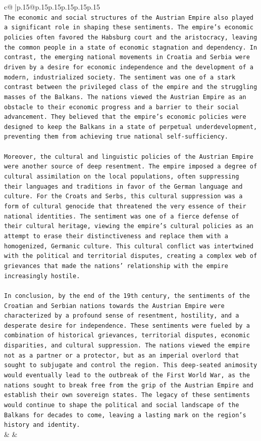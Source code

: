 \documentclass{article}
\begin{document}
{\begin{supertabular}{c@{$\;$}|p{.15\linewidth}@{}p{.15\linewidth}p{.15\linewidth}p{.15\linewidth}p{.15\linewidth}p{.15\linewidth}}
{{{\\ 
\texttt{The economic and social structures of the Austrian Empire also played a significant role in shaping these sentiments. The empire's economic policies often favored the Habsburg court and the aristocracy, leaving the common people in a state of economic stagnation and dependency. In contrast, the emerging national movements in Croatia and Serbia were driven by a desire for economic independence and the development of a modern, industrialized society. The sentiment was one of a stark contrast between the privileged class of the empire and the struggling masses of the Balkans. The nations viewed the Austrian Empire as an obstacle to their economic progress and a barrier to their social advancement. They believed that the empire's economic policies were designed to keep the Balkans in a state of perpetual underdevelopment, preventing them from achieving true national self{-}sufficiency.} \\
\\ 
\texttt{Moreover, the cultural and linguistic policies of the Austrian Empire were another source of deep resentment. The empire imposed a degree of cultural assimilation on the local populations, often suppressing their languages and traditions in favor of the German language and culture. For the Croats and Serbs, this cultural suppression was a form of cultural genocide that threatened the very essence of their national identities. The sentiment was one of a fierce defense of their cultural heritage, viewing the empire's cultural policies as an attempt to erase their distinctiveness and replace them with a homogenized, Germanic culture. This cultural conflict was intertwined with the political and territorial disputes, creating a complex web of grievances that made the nations' relationship with the empire increasingly hostile.} \\
\\ 
\texttt{In conclusion, by the end of the 19th century, the sentiments of the Croatian and Serbian nations towards the Austrian Empire were characterized by a profound sense of resentment, hostility, and a desperate desire for independence. These sentiments were fueled by a combination of historical grievances, territorial disputes, economic disparities, and cultural suppression. The nations viewed the empire not as a partner or a protector, but as an imperial overlord that sought to subjugate and control the region. This deep{-}seated animosity would eventually lead to the outbreak of the First World War, as the nations sought to break free from the grip of the Austrian Empire and establish their own sovereign states. The legacy of these sentiments would continue to shape the political and social landscape of the Balkans for decades to come, leaving a lasting mark on the region's history and identity.} \\
            }
        }
    }
    & & \\ \\


\end{supertabular}}
\end{document}
